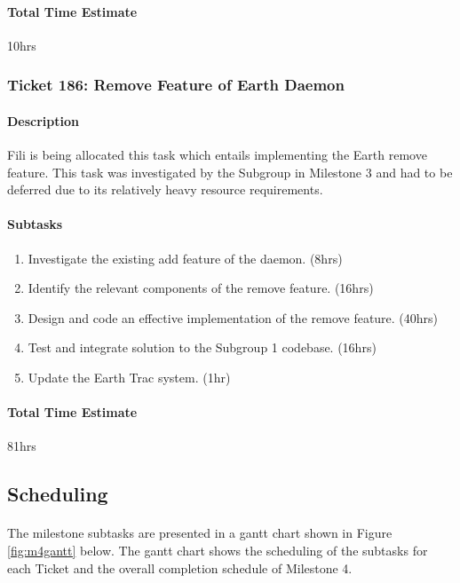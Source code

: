 \documentclass[10pt,a4,oneside]{article}
\begin{document}
\paragraph{Total Time Estimate} 10hrs
 
\subsubsection{Ticket 186: Remove Feature of Earth Daemon}

\paragraph{Description}
Fili is being allocated this task which entails implementing the 
Earth remove feature. This task was investigated by the Subgroup in Milestone 3
and had to be deferred due to its relatively heavy resource requirements.

\paragraph{Subtasks}
\noindent
\begin{enumerate}
\item Investigate the existing add feature of the daemon. (8hrs)
\item Identify the relevant components of the remove feature. (16hrs)
\item Design and code an effective implementation of the remove feature. (40hrs)
\item Test and integrate solution to the Subgroup 1 codebase. (16hrs)
\item Update the Earth Trac system. (1hr)
\end{enumerate}

\paragraph{Total Time Estimate} 81hrs

\newpage
 
\subsection{Scheduling}

\paragraph{} 
The milestone subtasks are presented in a gantt chart shown in Figure \ref{fig:m4gantt} below. 
The gantt chart shows the scheduling of the subtasks for each Ticket and the overall completion
schedule of Milestone 4. 
\end{document}
